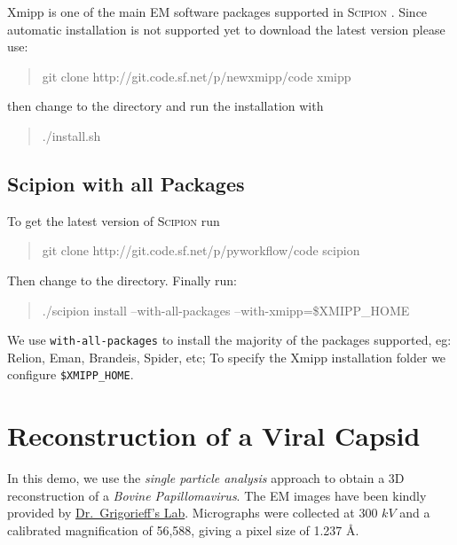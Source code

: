 \documentclass[12pt]{article} %
\newcommand{\scipion}{\textsc{Scipion} }
\newenvironment{command}{\tt\begin{quote}}{\end{quote}}
\newcommand{\comm}[1]{\texttt{#1}}
\begin{document}
Xmipp is one of the main EM software packages supported in \scipion. Since  automatic
installation is not supported yet to download
the latest version please use:

\begin{command}
git clone http://git.code.sf.net/p/newxmipp/code xmipp
\end{command}

\noindent
then change to the  directory and run the installation with

\begin{command}
./install.sh
\end{command}

\subsection{Scipion with all Packages}

To get the latest version of \scipion run

\begin{command}
git clone http://git.code.sf.net/p/pyworkflow/code scipion
\end{command}

\noindent
Then change to the  directory. Finally run:

\begin{command}
./scipion install --with-all-packages --with-xmipp=\$XMIPP\_HOME
\end{command}

\noindent
We use \comm{with-all-packages} to install the majority of the packages supported, eg:
Relion, Eman, Brandeis, Spider, etc; To specify the Xmipp installation folder we 
configure \verb+$XMIPP_HOME+.


\section{Reconstruction of a Viral Capsid}

In this demo, we use the \emph{single particle analysis} approach to obtain
a 3D reconstruction of a \emph{Bovine Papillomavirus}. The EM images have been kindly
provided by \href{http://grigoriefflab.janelia.org/}{Dr.~Grigorieff’s Lab}. Micrographs were
collected at 300 $kV$ and a calibrated magnification of 56,588,
giving a pixel
size of 1.237 \AA  \citep{Wolf2010}. 
\end{document}
